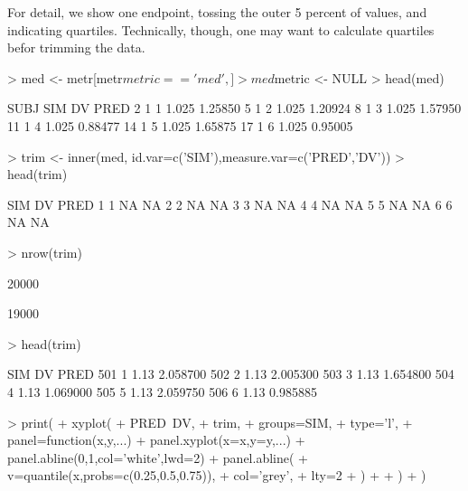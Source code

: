 For detail, we show one endpoint, tossing the outer 5 percent of values, and 
indicating quartiles. Technically, though, one may want to calculate quartiles
befor trimming the data.
\begin{Schunk}
\begin{Sinput}
> med <- metr[metr$metric=='med',]
> med$metric <- NULL
> head(med)
\end{Sinput}
\begin{Soutput}
   SUBJ SIM    DV    PRED
2     1   1 1.025 1.25850
5     1   2 1.025 1.20924
8     1   3 1.025 1.57950
11    1   4 1.025 0.88477
14    1   5 1.025 1.65875
17    1   6 1.025 0.95005
\end{Soutput}
\begin{Sinput}
> trim <- inner(med, id.var=c('SIM'),measure.var=c('PRED','DV'))
> head(trim)
\end{Sinput}
\begin{Soutput}
  SIM DV PRED
1   1 NA   NA
2   2 NA   NA
3   3 NA   NA
4   4 NA   NA
5   5 NA   NA
6   6 NA   NA
\end{Soutput}
\begin{Sinput}
> nrow(trim)
\end{Sinput}
\begin{Soutput}
[1] 20000
\end{Soutput}
\begin{Soutput}
[1] 19000
\end{Soutput}
\begin{Sinput}
> head(trim)
\end{Sinput}
\begin{Soutput}
    SIM   DV     PRED
501   1 1.13 2.058700
502   2 1.13 2.005300
503   3 1.13 1.654800
504   4 1.13 1.069000
505   5 1.13 2.059750
506   6 1.13 0.985885
\end{Soutput}
\begin{Sinput}
> print(
+ 	xyplot(
+ 		PRED~DV,
+ 		trim,
+ 		groups=SIM,
+ 		type='l',
+ 		panel=function(x,y,...){
+ 			panel.xyplot(x=x,y=y,...)
+ 			panel.abline(0,1,col='white',lwd=2)
+ 			panel.abline(
+ 				v=quantile(x,probs=c(0.25,0.5,0.75)),
+ 				col='grey',
+ 				lty=2
+ 			)
+ 		}
+ 	)
+ )
\end{Sinput}
\end{Schunk}
